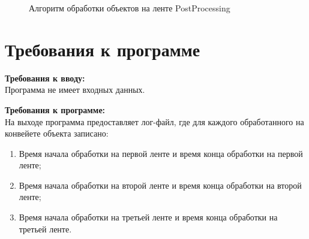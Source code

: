 \documentclass[a4paper,14pt]{report}
\begin{document}
\begin{figure}
\caption{Алгоритм обработки объектов на ленте PostProcessing}
\label{fig:image}
\end{figure}

\newpage

\section*{Требования к программе}

\textbf{Требования к вводу:}\\
Программа не имеет входных данных.

\textbf{Требования к программе:}\\
На выходе программа предоставляет лог-файл, где для каждого обработанного на конвейете объекта записано:
\begin{enumerate}
	\item Время начала обработки на первой ленте и время конца обработки на первой ленте;
	\item Время начала обработки на второй ленте и время конца обработки на второй ленте;
	\item Время начала обработки на третьей ленте и время конца обработки на третьей ленте.
\end{enumerate}
\end{document}

